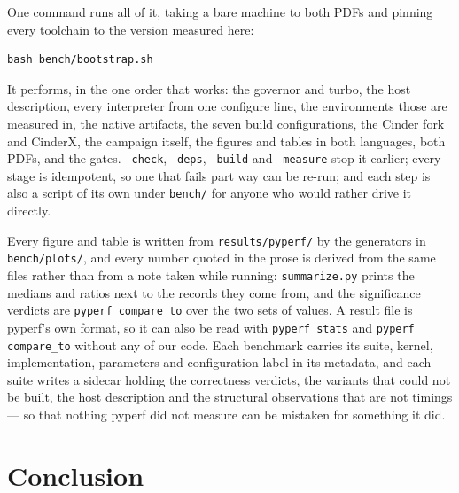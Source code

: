 \documentclass[10pt,a4paper]{article}
\newcommand{\code}[1]{\texttt{\small #1}}
\begin{document}
One command runs all of it, taking a bare machine to both PDFs and pinning every toolchain to
the version measured here:

\begin{Verbatim}[fontsize=\small,xleftmargin=1em]
bash bench/bootstrap.sh
\end{Verbatim}

\noindent
It performs, in the one order that works: the governor and turbo, the host description, every
interpreter from one configure line, the environments those are measured in, the native
artifacts, the seven build configurations, the Cinder fork and CinderX, the campaign itself,
the figures and tables in both languages, both PDFs, and the gates. \code{--check},
\code{--deps}, \code{--build} and \code{--measure} stop it earlier; every stage is
idempotent, so one that fails part way can be re-run; and each step is also a script of its own
under \code{bench/} for anyone who would rather drive it directly.

\noindent
Every figure and table is written from \code{results/pyperf/} by the generators in
\code{bench/plots/}, and every
number quoted in the prose is derived from the same files rather than from a note taken while
running: \code{summarize.py} prints the medians and ratios next to the records they come from,
and the significance verdicts are \code{pyperf compare\_to} over the two sets of values. A result file is pyperf's own format, so it can also be read with \code{pyperf
stats} and \code{pyperf compare\_to} without any of our code. Each benchmark carries its suite,
kernel, implementation, parameters and configuration label in its metadata, and each suite
writes a sidecar holding the correctness verdicts, the variants that could not be built, the
host description and the structural observations that are not timings --- so that nothing
pyperf did not measure can be mistaken for something it did.

\section{Conclusion}
\label{sec:conclusion}


\end{document}
